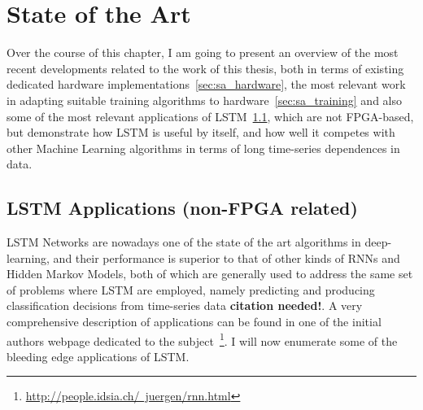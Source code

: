 \chapter{State of the Art}\label{chap:stateArt}

Over the course of this chapter, I am going to present an overview of the most recent developments related to the work of this thesis, both in terms of existing dedicated hardware implementations~\ref{sec:sa_hardware}, the most relevant work in adapting suitable training algorithms to hardware~\ref{sec:sa_training} and also some of the most relevant applications of LSTM~\ref{sec:sa_apps}, which are not FPGA-based, but demonstrate how LSTM is useful by itself, and how well it competes with other Machine Learning algorithms in terms of long time-series dependences in data.

\section{LSTM Applications (non-FPGA related)}\label{sec:sa_apps} 
LSTM Networks are nowadays one of the state of the art algorithms in deep-learning, and their performance is superior to that of other kinds of RNNs and Hidden Markov Models, both of which are generally used to address the same set of problems where LSTM are employed, namely predicting and producing classification decisions from time-series data \textbf{citation needed!}. A very comprehensive description of applications can be found in one of the initial authors webpage dedicated to the subject~\footnote{\href{http://people.idsia.ch/~juergen/rnn.html}{http://people.idsia.ch/~juergen/rnn.html}}. I will now enumerate some of the bleeding edge applications of LSTM.

